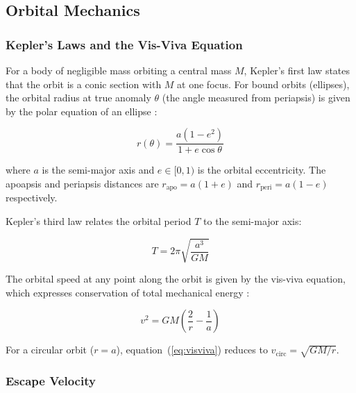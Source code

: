 \documentclass[10pt,a4paper]{article}
\begin{document}
\subsection{Orbital Mechanics}

\subsubsection{Kepler's Laws and the Vis-Viva Equation}

For a body of negligible mass orbiting a central mass $M$, Kepler's first law
states that the orbit is a conic section with $M$ at one focus.
For bound orbits (ellipses), the orbital radius at true anomaly $\theta$
(the angle measured from periapsis) is given by the polar equation of an
ellipse \citep{bate1971}:

\begin{equation}
r(\theta) = \frac{a(1 - e^2)}{1 + e\cos\theta}
\label{eq:polar}
\end{equation}

where $a$ is the semi-major axis and $e \in [0, 1)$ is the orbital eccentricity.
The apoapsis and periapsis distances are $r_{\mathrm{apo}} = a(1+e)$ and
$r_{\mathrm{peri}} = a(1-e)$ respectively.

Kepler's third law relates the orbital period $T$ to the semi-major axis:

\begin{formulabox}
\begin{equation}
T = 2\pi \sqrt{\frac{a^3}{GM}}
\label{eq:kepler3}
\end{equation}
\end{formulabox}

The orbital speed at any point along the orbit is given by the vis-viva
equation, which expresses conservation of total mechanical energy
\citep{curtis2020}:

\begin{formulabox}
\begin{equation}
v^2 = GM\left(\frac{2}{r} - \frac{1}{a}\right)
\label{eq:visviva}
\end{equation}
\end{formulabox}

For a circular orbit ($r = a$), equation~(\ref{eq:visviva}) reduces to
$v_{\mathrm{circ}} = \sqrt{GM/r}$.

\subsubsection{Escape Velocity}
\end{document}
